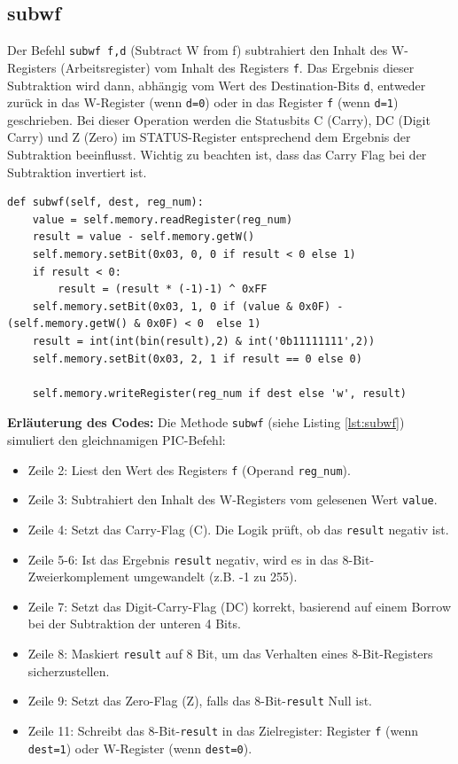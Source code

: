 \subsection{subwf}
Der Befehl \texttt{subwf f,d} (Subtract W from f) subtrahiert den Inhalt des W-Registers (Arbeitsregister) vom Inhalt des Registers \texttt{f}. Das Ergebnis dieser Subtraktion wird dann, abhängig vom Wert des Destination-Bits \texttt{d}, entweder zurück in das W-Register (wenn \texttt{d=0}) oder in das Register \texttt{f} (wenn \texttt{d=1}) geschrieben. Bei dieser Operation werden die Statusbits C (Carry), DC (Digit Carry) und Z (Zero) im STATUS-Register entsprechend dem Ergebnis der Subtraktion beeinflusst. Wichtig zu beachten ist, dass das Carry Flag bei der Subtraktion invertiert ist.

\begin{lstlisting}[caption={Methode subwf aus dem \ac{ALU} Modul}, label={lst:subwf}]
def subwf(self, dest, reg_num):
    value = self.memory.readRegister(reg_num)
    result = value - self.memory.getW()
    self.memory.setBit(0x03, 0, 0 if result < 0 else 1)
    if result < 0:
        result = (result * (-1)-1) ^ 0xFF
    self.memory.setBit(0x03, 1, 0 if (value & 0x0F) - (self.memory.getW() & 0x0F) < 0  else 1)
    result = int(int(bin(result),2) & int('0b11111111',2))
    self.memory.setBit(0x03, 2, 1 if result == 0 else 0)

    self.memory.writeRegister(reg_num if dest else 'w', result)
\end{lstlisting}
\textbf{Erläuterung des Codes:}
Die Methode \texttt{subwf} (siehe Listing \ref{lst:subwf}) simuliert den gleichnamigen PIC-Befehl:
\begin{itemize}
    \item Zeile 2: Liest den Wert des Registers \texttt{f} (Operand \texttt{reg\_num}).
    \item Zeile 3: Subtrahiert den Inhalt des W-Registers vom gelesenen Wert \texttt{value}.
    \item Zeile 4: Setzt das Carry-Flag (C). Die Logik prüft, ob das \texttt{result} negativ ist. 
    \item Zeile 5-6: Ist das Ergebnis \texttt{result} negativ, wird es in das 8-Bit-Zweierkomplement umgewandelt (z.B. -1 zu 255).
    \item Zeile 7: Setzt das Digit-Carry-Flag (DC) korrekt, basierend auf einem Borrow bei der Subtraktion der unteren 4 Bits.
    \item Zeile 8: Maskiert \texttt{result} auf 8 Bit, um das Verhalten eines 8-Bit-Registers sicherzustellen.
    \item Zeile 9: Setzt das Zero-Flag (Z), falls das 8-Bit-\texttt{result} Null ist.
    \item Zeile 11: Schreibt das 8-Bit-\texttt{result} in das Zielregister: Register \texttt{f} (wenn \texttt{dest=1}) oder W-Register (wenn \texttt{dest=0}).
\end{itemize}

